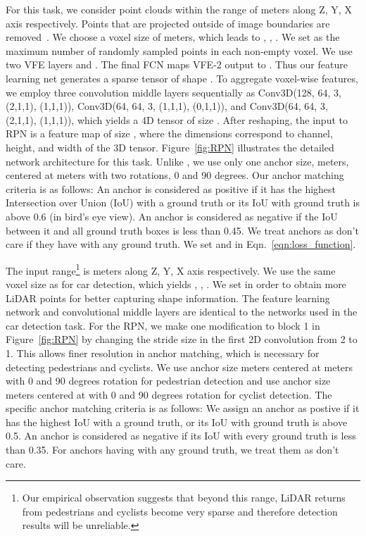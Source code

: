 \documentclass[10pt,twocolumn,letterpaper]{article}
\begin{document}
  For this task, we consider point clouds within the range of  meters along Z, Y, X axis respectively. Points that are projected outside of image boundaries are removed~\cite{REF:cvpr17chen}. We choose a voxel size of  meters, which leads to , , . We set  as the maximum number of randomly sampled points in each non-empty voxel. We use two VFE layers  and . The final FCN maps VFE-2 output to . Thus our feature learning net generates a sparse tensor of shape . To aggregate voxel-wise features, we employ three convolution middle layers sequentially as Conv3D(128, 64, 3, (2,1,1), (1,1,1)), Conv3D(64, 64, 3, (1,1,1), (0,1,1)), and Conv3D(64, 64, 3, (2,1,1), (1,1,1)), which yields a 4D tensor of size . After reshaping, the input to RPN is a feature map of size , where the dimensions correspond to channel, height, and width of the 3D tensor. Figure~\ref{fig:RPN} illustrates the detailed network architecture for this task. Unlike \cite{REF:cvpr17chen}, we use only one anchor size,  meters, centered at  meters with two rotations, 0 and 90 degrees. 
Our anchor matching criteria is as follows: An anchor is considered as positive if it has the highest Intersection over Union (IoU) with a ground truth or its IoU with ground truth is above 0.6 (in bird's eye view). An anchor is considered as negative if the IoU between it and all ground truth boxes is less than 0.45. We treat anchors as don't care if they have  with any ground truth. We set  and  in Eqn.~\ref{eqn:loss_function}.

 The input range\footnote{Our empirical observation suggests that beyond this range, LiDAR returns from pedestrians and cyclists become very sparse and therefore detection results will be unreliable.} is  meters along Z, Y, X axis respectively. We use the same voxel size as for car detection, which yields , , . We set  in order to obtain more LiDAR points for better capturing shape information. The feature learning network and convolutional middle layers are identical to the networks used in the car detection task. For the RPN, we make one modification to block 1 in Figure~\ref{fig:RPN} by changing the stride size in the first 2D convolution from 2 to 1. This allows finer resolution in anchor matching, which is necessary for detecting pedestrians and cyclists. We use anchor size  meters  centered at  meters with 0 and 90 degrees rotation for pedestrian detection and use anchor size  meters centered at  with 0 and 90 degrees rotation for cyclist detection.
The specific anchor matching criteria is as follows: We assign an anchor as postive if it has the highest IoU with a ground truth, or its IoU with ground truth is above 0.5. An anchor is considered as negative if its IoU with every ground truth is less than 0.35. For anchors having  with any ground truth, we treat them as don't care. 
\end{document}
